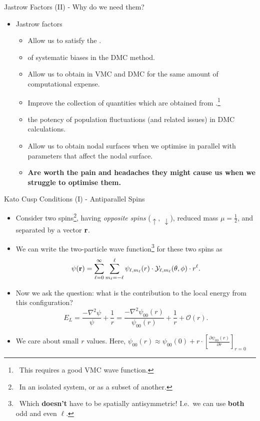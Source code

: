 \documentclass[12pt, pdf, hyperref={draft}, usenames, dvipsnames,
aspectratio=169]{beamer}
\newcommand{\blue}[1]{{\bf\color{NavyBlue}{#1}}}
\newcommand{\green}[1]{{\bf\color{ForestGreen}{#1}}}
\begin{document}
\begin{frame}{Jastrow Factors (II) - Why do we need them?}
\begin{itemize}
  \item Jastrow factors
  \begin{itemize}
    \item Allow us to satisfy the \blue{Kato cusp
    conditions}.
    \item \green{Lessen the extent} of systematic biases in the DMC method.
    \item Allow us to obtain \green{smaller error bars} in VMC and DMC for the same
    amount of computational expense.
    \item Improve the collection of quantities which are obtained from
    \blue{extrapolated estimates}.\footnote{\ This requires a good VMC wave
    function.}
    \item \green{Reduce} the potency of population fluctuations (and related
    issues) in DMC calculations.
    \item Allow us to obtain \green{even better} nodal surfaces when we
    optimise in parallel with parameters that affect the nodal surface.
    \pause{}
    \item {\bf Are worth the pain and headaches they might cause us when we
    struggle to optimise them.}
  \end{itemize}
\end{itemize}
\end{frame}


\begin{frame}{Kato Cusp Conditions (I) - Antiparallel Spins}

\begin{itemize}
  \item Consider two spins\footnote{\ In an isolated system, or as a subset of
  another.}, having \textit{opposite spins} ($\uparrow,\ \downarrow$),
  reduced mass $\mu=\frac{1}{2}$, and
  separated by a vector ${\bf r}$.
  \item We can write the two-particle wave function\footnote{\ Which {\bf
  doesn't}
  have to be spatially antisymmetric! I.e.\ we can use {\bf both} odd and even
  $\ell$.} for these two spins as
  \begin{equation}
    \psi({\bf r}) = \sum^{\infty}_{\ell=0}\sum^{\ell}_{m_{\ell}=-\ell}
    \psi_{\ell,m_{\ell}}(r)
    \cdot \mathcal{Y}_{\ell,m_{\ell}}(\theta,\phi)
    \cdot r^{\ell}.
  \end{equation}
  \item Now we ask the question: what is the contribution to the local energy
  from this configuration?
  \begin{equation}
    E_{L} = \dfrac{-\nabla^2\psi}{\psi} + \dfrac{1}{r} =
    \dfrac{-\nabla^2\psi_{00}(r)}{\psi_{00}(r)} + \dfrac{1}{r} +
    \mathcal{O}(r).
  \end{equation}
  \item We care about small $r$ values. Here, $\psi_{00}(r) \approx
  \psi_{00}(0) + r\cdot{\left[\frac{\partial\psi_{00}(r)}{\partial r}
  \right]}_{r=0}$
\end{itemize}
\end{frame}
\end{document}
